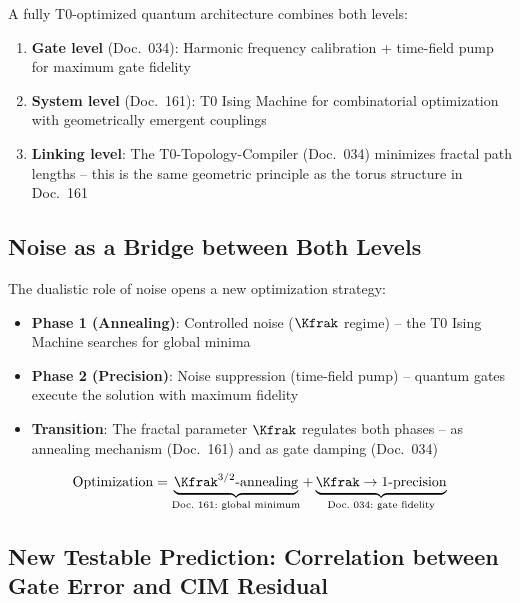 \begin{keyresult}
    A fully T0-optimized quantum architecture combines both levels:
    \begin{enumerate}
        \item \textbf{Gate level} (Doc.\ 034): Harmonic frequency calibration +
        time-field pump for maximum gate fidelity
        \item \textbf{System level} (Doc.\ 161): T0 Ising Machine for combinatorial
        optimization with geometrically emergent couplings
        \item \textbf{Linking level}: The T0-Topology-Compiler (Doc.\ 034) minimizes
        fractal path lengths -- this is the same geometric principle as the torus
        structure in Doc.\ 161
    \end{enumerate}
\end{keyresult}

\subsection{Noise as a Bridge between Both Levels}

The dualistic role of noise opens a new optimization strategy:

\begin{itemize}
    \item \textbf{Phase 1 (Annealing)}: Controlled noise ($\Kfrak$ regime)
    -- the T0 Ising Machine searches for global minima
    \item \textbf{Phase 2 (Precision)}: Noise suppression (time-field pump)
    -- quantum gates execute the solution with maximum fidelity
    \item \textbf{Transition}: The fractal parameter $\Kfrak$ regulates both phases --
    as annealing mechanism (Doc.\ 161) and as gate damping (Doc.\ 034)
\end{itemize}

\begin{equation}
    \text{Optimization} = \underbrace{\Kfrak^{3/2}\text{-annealing}}_{\text{Doc.\ 161:\ global minimum}}
    + \underbrace{\Kfrak \rightarrow 1\text{-precision}}_{\text{Doc.\ 034:\ gate fidelity}}
    \label{eq:hybrid_optimization}
\end{equation}

\subsection{New Testable Prediction: Correlation between Gate Error and CIM Residual}

